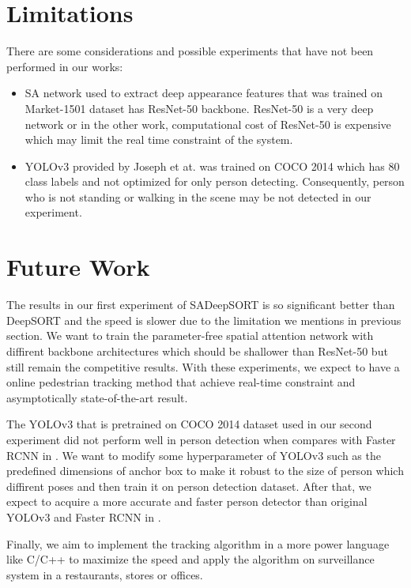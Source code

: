 \section{Limitations}
There are some considerations and possible experiments that have not been performed in our works:
\begin{itemize}
    \item SA network used to extract deep appearance features that was trained on Market-1501 dataset has ResNet-50 backbone. ResNet-50 is a very deep network or in the other work, computational cost of ResNet-50 is expensive which may limit the real time constraint of the system.
    \item YOLOv3 provided by Joseph et at.\cite{Wojke2017simple} was trained on COCO 2014 which has 80 class labels and not optimized for only person detecting. Consequently, person who is not standing or walking in the scene may be not detected in our experiment.
\end{itemize}

\section{Future Work} 
\hspace{0.5cm} The results in our first experiment of SADeepSORT is so significant better than DeepSORT\cite{Wojke2017simple} and
the speed is slower due to the limitation we mentions in previous section. We want to train the parameter-free spatial attention
network with diffirent backbone architectures which should be shallower than ResNet-50 but still remain the competitive results.
With these experiments, we expect to have a online pedestrian tracking method that achieve real-time constraint and asymptotically state-of-the-art result.\par 
The YOLOv3\cite{yolov3} that is pretrained on COCO 2014 dataset used in our second experiment did not perform well in person detection 
when compares with Faster RCNN in \cite{Wojke2017simple}. We want to modify some hyperparameter of YOLOv3 such as the predefined dimensions of
anchor box to make it robust to the size of person which diffirent poses and then train it on person detection dataset. After that,
we expect to acquire a more accurate and faster person detector than original YOLOv3\cite{yolov3} and Faster RCNN in \cite{Wojke2017simple}.\par 
Finally, we aim to implement the tracking algorithm in a more power language like C/C++ to maximize the speed and apply the algorithm
on surveillance system in a restaurants, stores or offices.
